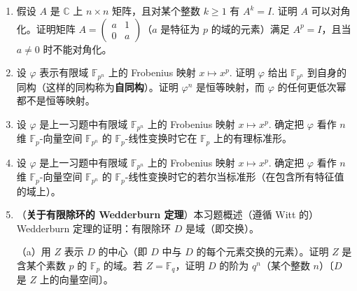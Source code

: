 \begin{enumerate}
（c）证明对任何不被 \(\ell\) 整除的整数 \(a\) 有 \(\mathbb{F}_p(\zeta_\ell) = \mathbb{F}_p(\zeta_\ell^a)\).〔一个包含是显然的；对另一个注意 \(\zeta_\ell = (\zeta_\ell^a)^b\)，其中 \(b\) 是 \(a\) 模 \(\ell\) 的乘法逆。〕用（b）断定在 \(\mathbb{F}_p[x]\) 中 \(\Phi_\ell(x)\) 是 \(\frac{\ell-1}{f}\) 个互异 \(f\) 次不可约多项式之积。

（d）特别地，证明在 \(\mathbb{F}_p[x]\) 中：\(p = 7\) 时 \(\Phi_7(x) = x^6+x^5+\cdots+x+1\) 是 \((x-1)^6\)；\(p \equiv 1 \bmod 7\) 时它是互异线性因子之积；\(p \equiv 6 \bmod 7\) 时它是 3 个不可约二次式之积；\(p \equiv 2, 4 \bmod 7\) 时它是 2 个不可约三次式之积；\(p \equiv 3, 5 \bmod 7\) 时它不可约。

\item 假设 \(A\) 是 \(\mathbb{C}\) 上 \(n \times n\) 矩阵，且对某个整数 \(k \geq 1\) 有 \(A^k = I\). 证明 \(A\) 可以对角化。证明矩阵 \(A = \begin{pmatrix} a & 1 \\ 0 & a \end{pmatrix}\)（\(a\) 是特征为 \(p\) 的域的元素）满足 \(A^p = I\)，且当 \(a \neq 0\) 时不能对角化。

\item 设 \(\varphi\) 表示有限域 \(\mathbb{F}_{p^n}\) 上的 Frobenius 映射 \(x \mapsto x^p\). 证明 \(\varphi\) 给出 \(\mathbb{F}_{p^n}\) 到自身的同构（这样的同构称为\textbf{自同构}）。证明 \(\varphi^n\) 是恒等映射，而 \(\varphi\) 的任何更低次幂都不是恒等映射。

\item 设 \(\varphi\) 是上一习题中有限域 \(\mathbb{F}_{p^n}\) 上的 Frobenius 映射 \(x \mapsto x^p\). 确定把 \(\varphi\) 看作 \(n\) 维 \(\mathbb{F}_p\)-向量空间 \(\mathbb{F}_{p^n}\) 的 \(\mathbb{F}_p\)-线性变换时它在 \(\mathbb{F}_p\) 上的有理标准形。

\item 设 \(\varphi\) 是上一习题中有限域 \(\mathbb{F}_{p^n}\) 上的 Frobenius 映射 \(x \mapsto x^p\). 确定把 \(\varphi\) 看作 \(n\) 维 \(\mathbb{F}_p\)-向量空间 \(\mathbb{F}_{p^n}\) 的 \(\mathbb{F}_p\)-线性变换时它的若尔当标准形（在包含所有特征值的域上）。

\item （\textbf{关于有限除环的 Wedderburn 定理}）本习题概述（遵循 Witt 的）Wedderburn 定理的证明：有限除环 \(D\) 是域（即交换）。

（a）用 \(Z\) 表示 \(D\) 的中心（即 \(D\) 中与 \(D\) 的每个元素交换的元素）。证明 \(Z\) 是含某个素数 \(p\) 的 \(\mathbb{F}_p\) 的域。若 \(Z = \mathbb{F}_q\)，证明 \(D\) 的阶为 \(q^n\)（某个整数 \(n\)）〔\(D\) 是 \(Z\) 上的向量空间〕。


\end{enumerate}

